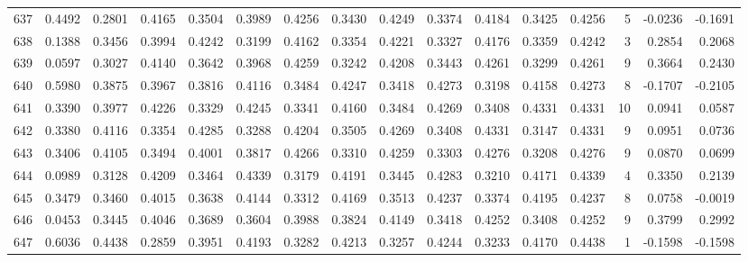 \begin{tabular}{lrrrrrrrrrrrrrrr}
637 &      0.4492 &  0.2801 &  0.4165 &  0.3504 &  0.3989 &  0.4256 &  0.3430 &  0.4249 &  0.3374 &  0.4184 &   0.3425 &     0.4256 &      5 &                   -0.0236 &                    -0.1691 \\
638 &      0.1388 &  0.3456 &  0.3994 &  0.4242 &  0.3199 &  0.4162 &  0.3354 &  0.4221 &  0.3327 &  0.4176 &   0.3359 &     0.4242 &      3 &                    0.2854 &                     0.2068 \\
639 &      0.0597 &  0.3027 &  0.4140 &  0.3642 &  0.3968 &  0.4259 &  0.3242 &  0.4208 &  0.3443 &  0.4261 &   0.3299 &     0.4261 &      9 &                    0.3664 &                     0.2430 \\
640 &      0.5980 &  0.3875 &  0.3967 &  0.3816 &  0.4116 &  0.3484 &  0.4247 &  0.3418 &  0.4273 &  0.3198 &   0.4158 &     0.4273 &      8 &                   -0.1707 &                    -0.2105 \\
641 &      0.3390 &  0.3977 &  0.4226 &  0.3329 &  0.4245 &  0.3341 &  0.4160 &  0.3484 &  0.4269 &  0.3408 &   0.4331 &     0.4331 &     10 &                    0.0941 &                     0.0587 \\
642 &      0.3380 &  0.4116 &  0.3354 &  0.4285 &  0.3288 &  0.4204 &  0.3505 &  0.4269 &  0.3408 &  0.4331 &   0.3147 &     0.4331 &      9 &                    0.0951 &                     0.0736 \\
643 &      0.3406 &  0.4105 &  0.3494 &  0.4001 &  0.3817 &  0.4266 &  0.3310 &  0.4259 &  0.3303 &  0.4276 &   0.3208 &     0.4276 &      9 &                    0.0870 &                     0.0699 \\
644 &      0.0989 &  0.3128 &  0.4209 &  0.3464 &  0.4339 &  0.3179 &  0.4191 &  0.3445 &  0.4283 &  0.3210 &   0.4171 &     0.4339 &      4 &                    0.3350 &                     0.2139 \\
645 &      0.3479 &  0.3460 &  0.4015 &  0.3638 &  0.4144 &  0.3312 &  0.4169 &  0.3513 &  0.4237 &  0.3374 &   0.4195 &     0.4237 &      8 &                    0.0758 &                    -0.0019 \\
646 &      0.0453 &  0.3445 &  0.4046 &  0.3689 &  0.3604 &  0.3988 &  0.3824 &  0.4149 &  0.3418 &  0.4252 &   0.3408 &     0.4252 &      9 &                    0.3799 &                     0.2992 \\
647 &      0.6036 &  0.4438 &  0.2859 &  0.3951 &  0.4193 &  0.3282 &  0.4213 &  0.3257 &  0.4244 &  0.3233 &   0.4170 &     0.4438 &      1 &                   -0.1598 &                    -0.1598 \\

\end{tabular}
